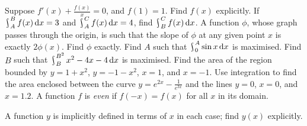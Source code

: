 \begin{questions}
  \questioM Suppose $ f'(x) + \frac{f(x)}{x} = 0 $, and $ f(1) = 1 $. Find $ f(x) $ explicitly.
  \questioM If $ \rint^B_A f(x) \dif{x} = 3 $ and $ \rint^C_A f(x) \dif{x} = 4 $, find $ \rint^C_B f(x) \dif{x} $.
  \questioM A function $ \phi $, whose graph passes through the origin, is such that the slope of $ \phi $ at any given
            point $ x $ is exactly $ 2\phi(x) $. Find $ \phi $ exactly.
  \questioE Find $ A $ such that $ \rint^A_0 \sin x \dif{x} $ is maximised.
  \questioE Find $ B $ such that $ \rint_B^{B^2} x^2 - 4x - 4 \dif{x} $ is maximised.
  \questioM Find the area of the region bounded by $ y = 1 + x^2 $, $ y = - 1 - x^2 $, $ x = 1 $, and $ x = -1 $.
  \questioM Use integration to find the area enclosed between the curve $ y = e^{2x} - \frac{1}{e^{3x}} $ and the
            lines $ y = 0 $, $ x = 0 $, and $ x = 1.2 $.
  \questioM A function $ f $ is \textit{even} if $ f(-x) = f(x) $ for all $ x $ in its domain.
  \questioM A function $ y $ is implicitly defined in terms of $ x $ in each case; find $ y(x) $ explicitly.
\end{questions}
